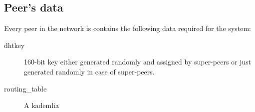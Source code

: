 \subsection{Peer's data}
Every peer in the network is contains the following data required for the
system:

\begin{description}
  \item[dhtkey] 160-bit key either generated randomly and assigned by
    super-peers or just generated randomly in case of super-peers.
  \item[routing\_table] A kademlia
\end{description}

